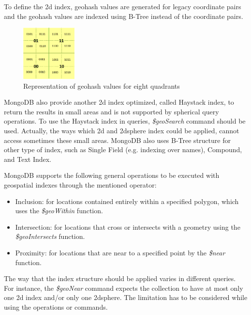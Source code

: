 \documentclass[a4paper,12pt]{article}
\begin{document}
To define the 2d index, geohash values are generated for legacy coordinate pairs and the geohash values are indexed using B-Tree instead of the coordinate pairs. 
\begin{figure}
\centering
\includegraphics[width=0.25\textwidth]{MongoIndex}
\caption{Representation of geohash values for eight quadrants}
\label{figmongoindex}
\end{figure}
MongoDB also provide another 2d index optimized, called Haystack index, to return the results in small areas and is not supported by spherical query operations. To use the Haystack index in queries, \textit{\$geoSearch} command should be used. Actually, the ways which 2d and 2dsphere index could be applied, cannot access sometimes these small areas. MongoDB also uses B-Tree structure for other type of index, such as Single Field (e.g. indexing over names), Compound, and Text Index. 

MongoDB supports the following general operations to be executed with geo\-spatial indexes through the mentioned operator:
\begin{itemize}
\item Inclusion: for locations contained entirely within a specified polygon, which uses the \textit{\$geo\-Within} function.
\item Intersection: for locations that cross or intersects with a geometry using the
\textit{\$geo\-Intersects} function.
\item Proximity: for locations that are near to a specified point by the \textit{\$near}
function. 
\end{itemize}
The way that the index structure should be applied varies in different queries. For instance, the \textit{\$geo\-Near} command expects the collection to have at most only one 2d index and/or only one 2dsphere. The limitation has to be considered while using the operations or commands. 
\end{document}
